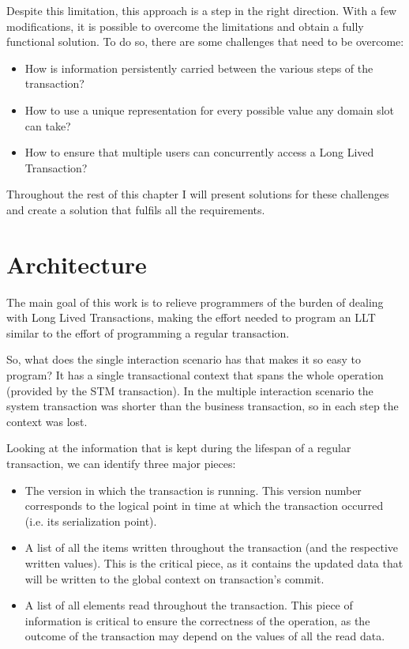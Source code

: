 Despite this limitation, this approach is a step in the right
direction. With a few modifications, it is possible to overcome the
limitations and obtain a fully functional solution. To do so, there
are some challenges that need to be overcome:

\begin{itemize}

\item How is information persistently carried between the various
  steps of the transaction?

\item How to use a unique representation for every possible value any
  domain slot can take?

\item How to ensure that multiple users can concurrently access a Long
  Lived Transaction?

\end{itemize}

Throughout the rest of this chapter I will present solutions for these
challenges and create a solution that fulfils all the requirements.

\section{Architecture}
\label{sec:arch}

The main goal of this work is to relieve programmers of the burden of
dealing with Long Lived Transactions, making the effort needed to
program an LLT similar to the effort of programming a regular
transaction.

So, what does the single interaction scenario has that makes it so
easy to program? It has a single transactional context that spans the
whole operation (provided by the STM transaction). In the multiple
interaction scenario the system transaction was shorter than the
business transaction, so in each step the context was lost.

Looking at the information that is kept during the lifespan of a
regular transaction, we can identify three major pieces:

\begin{itemize}
\item The version in which the transaction is running. This version
  number corresponds to the logical point in time at which the
  transaction occurred (i.e. its serialization point).
\item A list of all the items written throughout the transaction (and
  the respective written values). This is the critical piece, as it
  contains the updated data that will be written to the global context
  on transaction's commit.
\item A list of all elements read throughout the transaction. This
  piece of information is critical to ensure the correctness of the
  operation, as the outcome of the transaction may depend on the
  values of all the read data.
\end{itemize}


